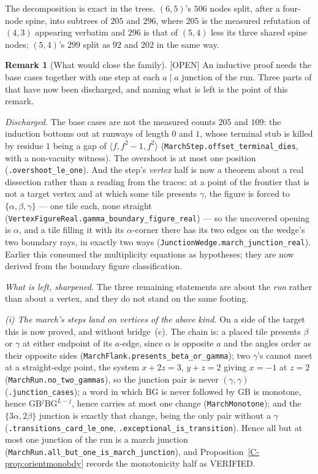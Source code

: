 \documentclass[11pt,reqno]{amsart}
\theoremstyle{plain}
\theoremstyle{definition}
\newtheorem{remark}[theorem]{Remark}
\newcommand{\lab}[1]{\hfill\textnormal{\footnotesize\textsc{[#1]}}}
\begin{document}
The decomposition is exact in the trees. $(6,5)$'s $506$ nodes split, after a four-node spine, into
subtrees of $205$ and $296$, where $205$ is the measured refutation of $(4,3)$ appearing verbatim
and $296$ is that of $(5,4)$ less its three shared spine nodes; $(5,4)$'s $299$ split as $92$ and
$202$ in the same way.

\begin{remark}[What would close the family]\label{rem:marchobl}\lab{OPEN}
An inductive proof needs the base cases together with one step at each $a\mid a$ junction of the
run. Three parts of that have now been discharged, and naming what is left is the point of this
remark.

\emph{Discharged.} The base cases are not the measured counts $205$ and $109$: the induction
bottoms out at runways of length $0$ and $1$, whose terminal stub is killed by residue $1$ being a
gap of $\langle f,f^2-1,f^2\rangle$ (\texttt{MarchStep.offset\_terminal\_dies}, with a non-vacuity
witness). The overshoot is at most one position (\texttt{.overshoot\_le\_one}). And the step's
\emph{vertex} half is now a theorem about a real dissection rather than a reading from the traces:
at a point of the frontier that is not a target vertex and at which some tile presents $\gamma$, the
figure is forced to $\{\alpha,\beta,\gamma\}$ --- one tile each, none straight
(\texttt{VertexFigureReal.gamma\_boundary\_figure\_real}) --- so the uncovered opening is $\alpha$,
and a tile filling it with its $\alpha$-corner there has its two edges on the wedge's two boundary
rays, in exactly two ways (\texttt{JunctionWedge.march\_junction\_real}). Earlier this consumed the
multiplicity equations as hypotheses; they are now derived from the boundary figure classification.

\emph{What is left, sharpened.} The three remaining statements are about the \emph{run} rather
than about a vertex, and they do not stand on the same footing.

\emph{(i) The march's steps land on vertices of the above kind.} On a side of the target this is
now proved, and without bridge~(c). The chain is: a placed tile presents $\beta$ or $\gamma$ at
either endpoint of its $a$-edge, since $\alpha$ is opposite $a$ and the angles order as their
opposite sides (\texttt{MarchFlank.presents\_beta\_or\_gamma}); two $\gamma$'s cannot meet at a
straight-edge point, the system $x+2z=3$, $y+z=2$ giving $x=-1$ at $z=2$
(\texttt{MarchRun.no\_two\_gammas}), so the junction pair is never $(\gamma,\gamma)$
(\texttt{.junction\_cases}); a word in which $\mathrm{BG}$ is never followed by $\mathrm{GB}$ is
monotone, hence $\mathrm{GB}^{j}\mathrm{BG}^{L-j}$, hence carries at most one change
(\texttt{MarchMonotone}); and the $\{3\alpha,2\beta\}$ junction is exactly that change, being the
only pair without a $\gamma$ (\texttt{.transitions\_card\_le\_one},
\texttt{.exceptional\_is\_transition}). Hence all but at most one junction of the run is a march
junction (\texttt{MarchRun.all\_but\_one\_is\_march\_junction}), and
Proposition~\ref{C-prop:orientmonobdy} records the monotonicity half as VERIFIED.


\end{remark}
\end{document}
